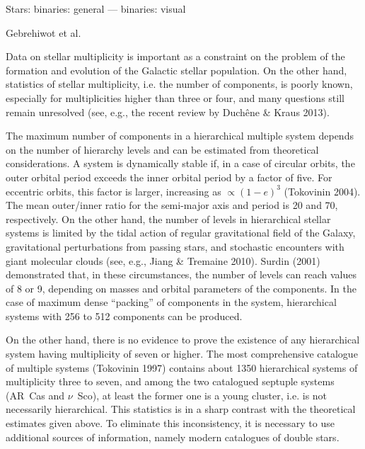 \documentclass[10pt,a4paper,twoside]{article}
\begin{document}
\begin{keywords}
Stars: binaries: general --- binaries: visual
\end{keywords}

{Gebrehiwot et al.}


Data on stellar multiplicity is important as a constraint on the
problem of the formation and evolution of the Galactic stellar
population. On the other hand, statistics of stellar multiplicity,
i.e. the number of components, is poorly known, especially for
multiplicities higher than three or four, and many questions still
remain unresolved (see, e.g., the recent review by Duch\^ene \&
Kraus 2013).

The maximum number of components in a hierarchical multiple system
depends on the number of hierarchy levels and can be estimated
from theoretical considerations. A system is dynamically stable
if, in a case of circular orbits, the outer orbital period exceeds
the inner orbital period by a factor of five. For eccentric
orbits, this factor is larger, increasing as $\propto (1-e)^3$
(Tokovinin 2004). The mean outer/inner ratio for the semi-major
axis and period is 20 and 70, respectively. On the other hand, the
number of levels in hierarchical stellar systems is limited by the
tidal action of regular gravitational field of the Galaxy,
gravitational perturbations from passing stars, and stochastic
encounters with giant molecular clouds (see, e.g., Jiang \&
Tremaine 2010). Surdin (2001) demonstrated that, in these
circumstances, the number of levels can reach values of 8 or 9,
depending on masses and orbital parameters of the components. In
the case of maximum dense ``packing'' of components in the system,
hierarchical systems with 256 to 512 components can be produced.

On the other hand, there is no evidence to prove the existence of
any hierarchical system having multiplicity of seven or higher.
The most comprehensive catalogue of multiple systems (Tokovinin
1997) contains about 1350 hierarchical systems of multiplicity
three to seven, and among the two catalogued septuple systems
(AR~Cas and $\nu$~Sco), at least the former one is a young
cluster, i.e. is not necessarily hierarchical. This statistics is
in a sharp contrast with the theoretical estimates given above. To
eliminate this inconsistency, it is necessary to use additional
sources of information, namely modern catalogues of double stars.
\end{document}
